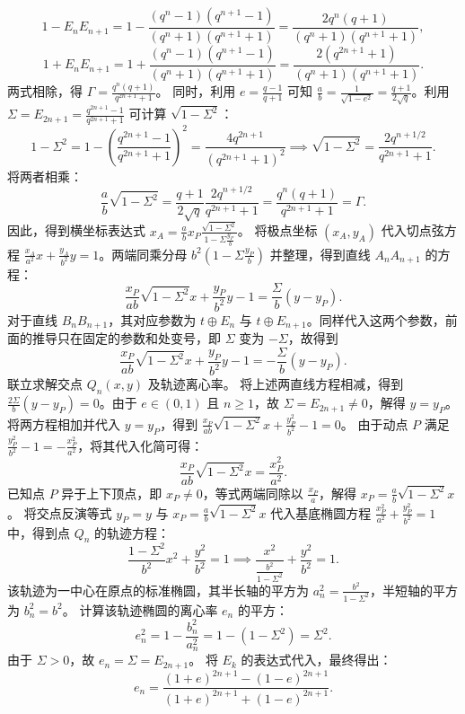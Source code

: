 \begin{solution}
\[ 1-E_n E_{n+1} = 1 - \frac{(q^n-1)(q^{n+1}-1)}{(q^n+1)(q^{n+1}+1)} = \frac{2q^n(q+1)}{(q^n+1)(q^{n+1}+1)}, \]
\[ 1+E_n E_{n+1} = 1 + \frac{(q^n-1)(q^{n+1}-1)}{(q^n+1)(q^{n+1}+1)} = \frac{2(q^{2n+1}+1)}{(q^n+1)(q^{n+1}+1)}. \]
两式相除，得 $\Gamma = \frac{q^n(q+1)}{q^{2n+1}+1}$。
同时，利用 $e = \frac{q-1}{q+1}$ 可知 $\frac{a}{b} = \frac{1}{\sqrt{1-e^2}} = \frac{q+1}{2\sqrt{q}}$。利用 $\Sigma = E_{2n+1} = \frac{q^{2n+1}-1}{q^{2n+1}+1}$ 可计算 $\sqrt{1-\Sigma^2}$：
\[ 1-\Sigma^2 = 1 - \left(\frac{q^{2n+1}-1}{q^{2n+1}+1}\right)^2 = \frac{4q^{2n+1}}{(q^{2n+1}+1)^2} \implies \sqrt{1-\Sigma^2} = \frac{2q^{n+1/2}}{q^{2n+1}+1}. \]
将两者相乘：
\[ \frac{a}{b} \sqrt{1-\Sigma^2} = \frac{q+1}{2\sqrt{q}} \frac{2q^{n+1/2}}{q^{2n+1}+1} = \frac{q^n(q+1)}{q^{2n+1}+1} = \Gamma. \]
因此，得到横坐标表达式 $x_A = \frac{a}{b} x_P \frac{\sqrt{1-\Sigma^2}}{1 - \Sigma\frac{y_P}{b}}$。
将极点坐标 $(x_A, y_A)$ 代入切点弦方程 $\frac{x_A}{a^2}x + \frac{y_A}{b^2}y = 1$。两端同乘分母 $b^2\left(1 - \Sigma\frac{y_P}{b}\right)$ 并整理，得到直线 $A_n A_{n+1}$ 的方程：
\[ \frac{x_P}{ab}\sqrt{1-\Sigma^2} x + \frac{y_P}{b^2}y - 1 = \frac{\Sigma}{b}(y - y_P). \]
对于直线 $B_n B_{n+1}$，其对应参数为 $t \oplus E_n$ 与 $t \oplus E_{n+1}$。同样代入这两个参数，前面的推导只在固定的参数和处变号，即 $\Sigma$ 变为 $-\Sigma$，故得到
\[ \frac{x_P}{ab}\sqrt{1-\Sigma^2} x + \frac{y_P}{b^2}y - 1 = -\frac{\Sigma}{b}(y - y_P). \]
联立求解交点 $Q_n(x,y)$ 及轨迹离心率。
将上述两直线方程相减，得到 $\frac{2\Sigma}{b}(y - y_P) = 0$。由于 $e \in (0, 1)$ 且 $n \ge 1$，故 $\Sigma = E_{2n+1} \neq 0$，解得 $y = y_P$。
将两方程相加并代入 $y = y_P$，得到 $\frac{x_P}{ab}\sqrt{1-\Sigma^2} x + \frac{y_P^2}{b^2} - 1 = 0$。
由于动点 $P$ 满足 $\frac{y_P^2}{b^2} - 1 = -\frac{x_P^2}{a^2}$，将其代入化简可得：
\[ \frac{x_P}{ab}\sqrt{1-\Sigma^2} x = \frac{x_P^2}{a^2}. \]
已知点 $P$ 异于上下顶点，即 $x_P \neq 0$，等式两端同除以 $\frac{x_P}{a}$，解得 $x_P = \frac{a}{b}\sqrt{1-\Sigma^2} x$。
将交点反演等式 $y_P = y$ 与 $x_P = \frac{a}{b}\sqrt{1-\Sigma^2} x$ 代入基底椭圆方程 $\frac{x_P^2}{a^2} + \frac{y_P^2}{b^2} = 1$ 中，得到点 $Q_n$ 的轨迹方程：
\[ \frac{1-\Sigma^2}{b^2} x^2 + \frac{y^2}{b^2} = 1 \implies \frac{x^2}{\frac{b^2}{1-\Sigma^2}} + \frac{y^2}{b^2} = 1. \]
该轨迹为一中心在原点的标准椭圆，其半长轴的平方为 $a_n^2 = \frac{b^2}{1-\Sigma^2}$，半短轴的平方为 $b_n^2 = b^2$。
计算该轨迹椭圆的离心率 $e_n$ 的平方：
\[ e_n^2 = 1 - \frac{b_n^2}{a_n^2} = 1 - (1-\Sigma^2) = \Sigma^2. \]
由于 $\Sigma > 0$，故 $e_n = \Sigma = E_{2n+1}$。
将 $E_k$ 的表达式代入，最终得出：
\[ e_n = \frac{(1+e)^{2n+1} - (1-e)^{2n+1}}{(1+e)^{2n+1} + (1-e)^{2n+1}}. \]
\end{solution}

